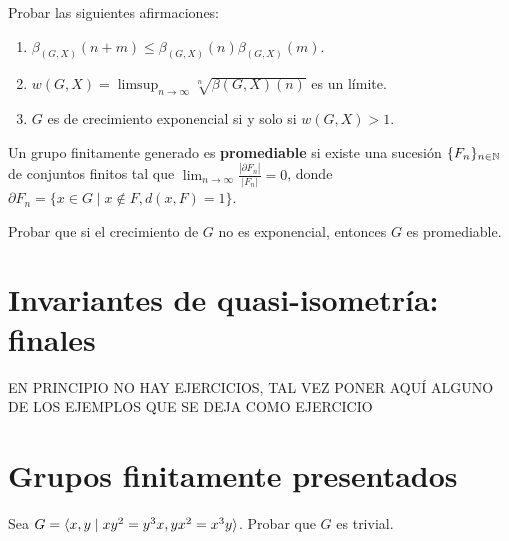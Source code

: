 \documentclass[twoside]{article}
\begin{document}
\newpage

\begin{ejercicio}{2.3}
Probar las siguientes afirmaciones:
\begin{enumerate}
\item $\beta_{(G,X)}(n+m)\leq \beta_{(G,X)}(n)\beta_{(G,X)}(m)$.
\item $w(G,X)=\limsup_{n\to \infty}\sqrt[n]{\beta(G,X)(n)}$ es un límite. 
\item $G$ es de crecimiento exponencial si y solo si $w(G,X)>1$.
\end{enumerate}
\end{ejercicio}
\begin{solucion}

\end{solucion}

\newpage

\begin{ejercicio}{2.4}
Un grupo finitamente generado es \textbf{promediable} si existe una sucesión $\{F_n\}_{n\in\mathbb{N}}$ de conjuntos finitos tal que $\lim_{n\to\infty}\frac{|\partial F_n|}{|F_n|}=0$, donde $\partial F_n=\{x\in G\mid x\notin F, d(x,F)=1\}$.

Probar que si el crecimiento de $G$ no es exponencial, entonces $G$ es promediable. 
\end{ejercicio}
\begin{solucion}

\end{solucion}

\newpage

\section{Invariantes de quasi-isometría: finales}

EN PRINCIPIO NO HAY EJERCICIOS, TAL VEZ PONER AQUÍ ALGUNO DE LOS EJEMPLOS QUE SE DEJA COMO EJERCICIO

\section{Grupos finitamente presentados}
\begin{ejercicio}{3.1}

Sea $G=\langle{x,y\mid xy^2=y^3x, yx^2=x^3y}\rangle$. Probar que $G$ es trivial.
\end{ejercicio}
\begin{solucion}

\end{solucion}
\end{document}
